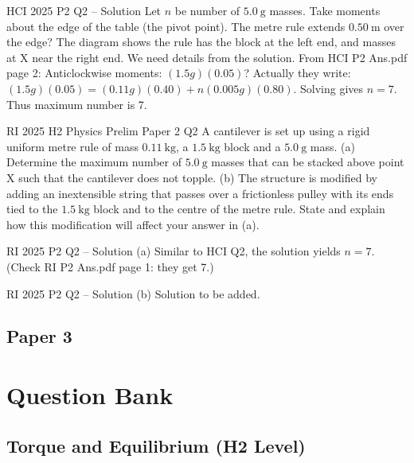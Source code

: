 \documentclass[11pt]{beamer}
\begin{document}
\begin{frame}[shrink=15]{HCI 2025 P2 Q2 – Solution}
Let $n$ be number of $5.0\ \mathrm{g}$ masses. Take moments about the edge of the table (the pivot point). The metre rule extends $0.50\ \mathrm{m}$ over the edge? The diagram shows the rule has the block at the left end, and masses at X near the right end. We need details from the solution. From HCI P2 Ans.pdf page 2:
Anticlockwise moments: $(1.5g)(0.05)$? Actually they write: $(1.5g)(0.05) = (0.11g)(0.40) + n(0.005g)(0.80)$. Solving gives $n = 7$.
Thus maximum number is 7.
\end{frame}

\begin{frame}[shrink=15]{RI 2025 H2 Physics Prelim Paper 2 Q2}
A cantilever is set up using a rigid uniform metre rule of mass $0.11\ \mathrm{kg}$, a $1.5\ \mathrm{kg}$ block and a $5.0\ \mathrm{g}$ mass. (a) Determine the maximum number of $5.0\ \mathrm{g}$ masses that can be stacked above point X such that the cantilever does not topple. (b) The structure is modified by adding an inextensible string that passes over a frictionless pulley with its ends tied to the $1.5\ \mathrm{kg}$ block and to the centre of the metre rule. State and explain how this modification will affect your answer in (a).
\end{frame}

\begin{frame}{RI 2025 P2 Q2 – Solution (a)}
Similar to HCI Q2, the solution yields $n = 7$. (Check RI P2 Ans.pdf page 1: they get 7.)
\end{frame}

\begin{frame}[shrink=15]{RI 2025 P2 Q2 – Solution (b)}
Solution to be added.
\end{frame}

\subsection{Paper 3}

\section{Question Bank}

\subsection{Torque and Equilibrium (H2 Level)}
\end{document}
